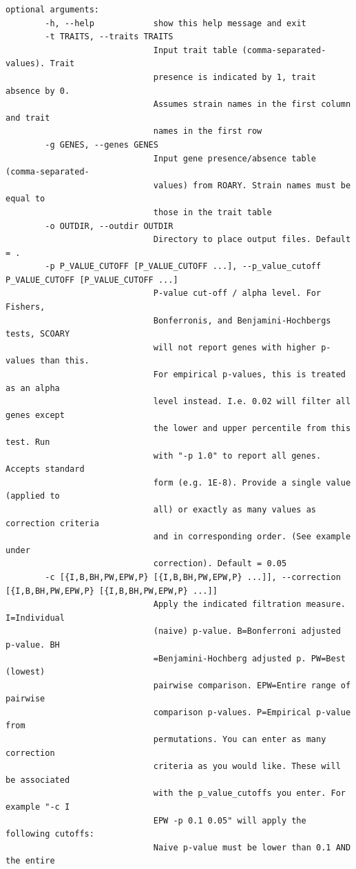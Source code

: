 \documentclass{article}
\begin{document}
\begin{lstlisting}[basicstyle=\fontsize{6}{11}\ttfamily,breaklines]
      optional arguments:
        -h, --help            show this help message and exit
        -t TRAITS, --traits TRAITS
                              Input trait table (comma-separated-values). Trait
                              presence is indicated by 1, trait absence by 0.
                              Assumes strain names in the first column and trait
                              names in the first row
        -g GENES, --genes GENES
                              Input gene presence/absence table (comma-separated-
                              values) from ROARY. Strain names must be equal to
                              those in the trait table
        -o OUTDIR, --outdir OUTDIR
                              Directory to place output files. Default = .
        -p P_VALUE_CUTOFF [P_VALUE_CUTOFF ...], --p_value_cutoff P_VALUE_CUTOFF [P_VALUE_CUTOFF ...]
                              P-value cut-off / alpha level. For Fishers,
                              Bonferronis, and Benjamini-Hochbergs tests, SCOARY
                              will not report genes with higher p-values than this.
                              For empirical p-values, this is treated as an alpha
                              level instead. I.e. 0.02 will filter all genes except
                              the lower and upper percentile from this test. Run
                              with "-p 1.0" to report all genes. Accepts standard
                              form (e.g. 1E-8). Provide a single value (applied to
                              all) or exactly as many values as correction criteria
                              and in corresponding order. (See example under
                              correction). Default = 0.05
        -c [{I,B,BH,PW,EPW,P} [{I,B,BH,PW,EPW,P} ...]], --correction [{I,B,BH,PW,EPW,P} [{I,B,BH,PW,EPW,P} ...]]
                              Apply the indicated filtration measure. I=Individual
                              (naive) p-value. B=Bonferroni adjusted p-value. BH
                              =Benjamini-Hochberg adjusted p. PW=Best (lowest)
                              pairwise comparison. EPW=Entire range of pairwise
                              comparison p-values. P=Empirical p-value from
                              permutations. You can enter as many correction
                              criteria as you would like. These will be associated
                              with the p_value_cutoffs you enter. For example "-c I
                              EPW -p 0.1 0.05" will apply the following cutoffs:
                              Naive p-value must be lower than 0.1 AND the entire

\end{lstlisting}
\end{document}
